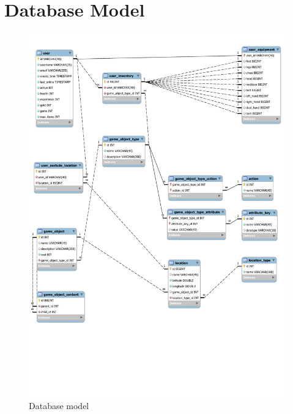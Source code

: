 \section{Database Model}
\begin{figure}[h]	
	\includegraphics[width=\textwidth, trim={0 5cm 0 0}]{figures/DatabaseModel}
	\centering
	\caption{Database model}
	\label{fig:dbmodel}	
\end{figure}
%
%	
%	
%	
%	
